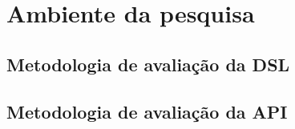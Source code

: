\section{Ambiente da pesquisa}
\label{ambiente}

\subsection{Metodologia de avaliação da DSL}
\label{metododsl}

\subsection{Metodologia de avaliação da API}
\label{metodoapi}